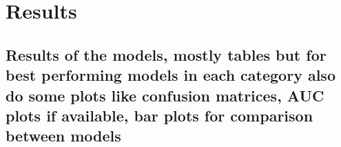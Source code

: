 \chapter{Results}
\label{cha:Results}

\section{Results of the models, mostly tables but for best performing models in each category also do some plots like confusion matrices, AUC plots if available, bar plots for comparison between models}